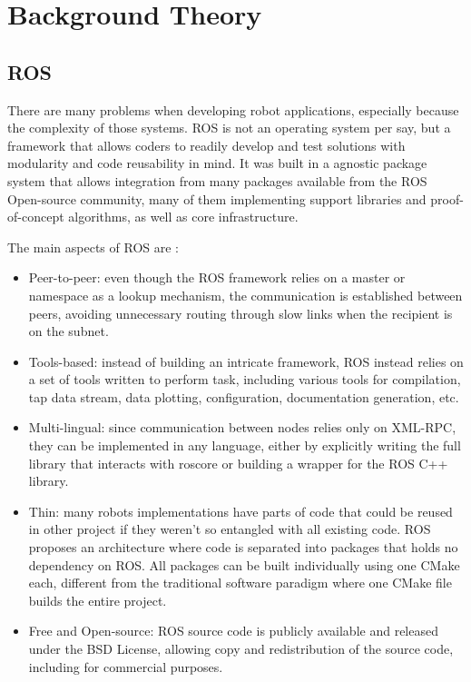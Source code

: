 \chapter{Background Theory}\label{chp:fundament}

%

\section{ROS}

There are many problems when developing robot applications, especially because the complexity of those systems. ROS is not an operating system per say, but a framework that allows coders to readily develop and test solutions with modularity and code reusability in mind. It was built in a agnostic package system that allows integration from many packages available from the ROS Open-source community, many of them implementing support libraries and proof-of-concept algorithms, as well as core infrastructure.

The main aspects of ROS are \cite{quigley2009ros}:

\begin{itemize}
\item Peer-to-peer: even though the ROS framework relies on a master or namespace as a lookup mechanism, the communication is established between peers, avoiding unnecessary routing through slow links when the recipient is on the subnet.
\item Tools-based: instead of building an intricate framework, ROS instead relies on a set of tools written to perform task, including various tools for compilation, tap data stream, data plotting, configuration, documentation generation, etc.
\item Multi-lingual: since communication between nodes relies only on XML-RPC, they can be implemented in any language, either by explicitly writing the full library that interacts with roscore or building a wrapper for the ROS C++ library.
\item Thin: many robots implementations have parts of code that could be reused in other project if they weren't so entangled with all existing code. ROS proposes an architecture where code is separated into packages that holds no dependency on ROS. All packages can be built individually using one CMake each, different from the traditional software paradigm where one CMake file builds the entire project.
\item Free and Open-source: ROS source code is publicly available and released under the BSD License, allowing copy and redistribution of the source code, including for commercial purposes.
\end{itemize}

